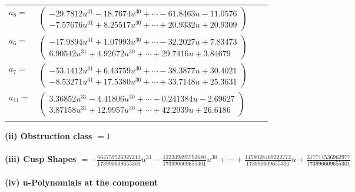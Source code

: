 \documentclass[1p]{elsarticle_modified}
\theoremstyle{definition}
\begin{document}
\begin{tabular}{m{7pt} m{180pt} m{7pt} m{180pt} }
\flushright $a_{8}=$&$\begin{pmatrix}-29.7812 u^{31}-18.7674 u^{30}+\cdots-61.8463 u-11.0576\\-7.57676 u^{31}+8.25517 u^{30}+\cdots+20.9332 u+20.9309\end{pmatrix}$ \\
\flushright $a_{6}=$&$\begin{pmatrix}-17.9894 u^{31}+1.07993 u^{30}+\cdots-32.2027 u+7.83473\\6.90542 u^{31}+4.92672 u^{30}+\cdots+29.7416 u+3.84679\end{pmatrix}$ \\
\flushright $a_{7}=$&$\begin{pmatrix}-53.1412 u^{31}+6.43759 u^{30}+\cdots-38.3877 u+30.4021\\-8.53271 u^{31}+17.5380 u^{30}+\cdots+33.7148 u+25.3631\end{pmatrix}$ \\
\flushright $a_{11}=$&$\begin{pmatrix}3.36852 u^{31}-4.41806 u^{30}+\cdots-0.241384 u-2.69627\\3.87158 u^{31}+12.9957 u^{30}+\cdots+42.2939 u+26.6186\end{pmatrix}$\\&\end{tabular}
\flushleft \textbf{(ii) Obstruction class $= 1$}\\~\\
\flushleft \textbf{(iii) Cusp Shapes $= -\frac{664759526927211}{173990609655301} u^{31}-\frac{122349895792680}{173990609655301} u^{30}+\cdots+\frac{1458028469222772}{173990609655301} u+\frac{317711536962977}{173990609655301}$}\\~\\
\newpage\renewcommand{\arraystretch}{1}
\flushleft \textbf{(iv) u-Polynomials at the component}\newline \\
\end{document}
